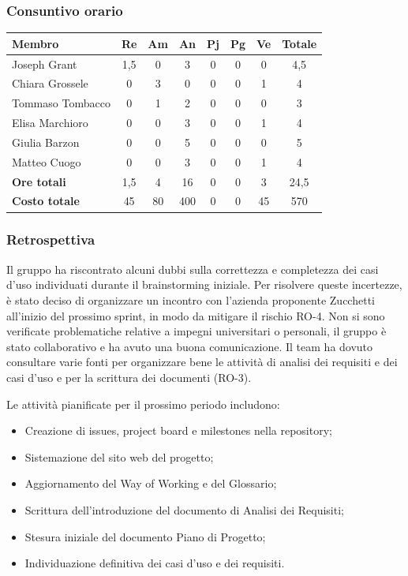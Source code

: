 \documentclass[11pt,a4paper]{article}
\begin{document}
\subsubsection{Consuntivo orario}
\begin{center}
    \begin{tabular}{|l|c|c|c|c|c|c|c|}
        \hline
        \textbf{Membro} & \textbf{Re} & \textbf{Am} & \textbf{An} & \textbf{Pj} & \textbf{Pg} & \textbf{Ve} & \textbf{Totale} \\
        \hline
        Joseph Grant & 1,5 & 0 & 3 & 0 & 0 & 0 & 4,5 \\
        \hline
        Chiara Grossele & 0 & 3 & 0 & 0 & 0 & 1 & 4 \\
        \hline
        Tommaso Tombacco & 0 & 1 & 2 & 0 & 0 & 0 & 3 \\
        \hline
        Elisa Marchioro & 0 & 0 & 3 & 0 & 0 & 1 & 4 \\
        \hline
        Giulia Barzon & 0 & 0 & 5 & 0 & 0 & 0 & 5 \\
        \hline
        Matteo Cuogo & 0 & 0 & 3 & 0 & 0 & 1 & 4 \\
        \hline
        \textbf{Ore totali} & 1,5 & 4 & 16 & 0 & 0 & 3 & 24,5 \\
        \hline
        \textbf{Costo totale} & 45 & 80 & 400 & 0 & 0 & 45 & 570 \\
        \hline
    \end{tabular}
\end{center}

\subsubsection{Retrospettiva}
Il gruppo ha riscontrato alcuni dubbi sulla correttezza e completezza dei casi d'uso individuati durante il brainstorming iniziale. Per risolvere queste incertezze, è stato deciso di organizzare un incontro con l'azienda proponente Zucchetti all'inizio del prossimo sprint, in modo da mitigare il rischio RO-4.
Non si sono verificate problematiche relative a impegni universitari o personali, il gruppo è stato collaborativo e ha avuto una buona comunicazione. Il team ha dovuto consultare varie fonti per organizzare bene le attività di analisi dei requisiti e dei casi d'uso e per la scrittura dei documenti (RO-3).

Le attività pianificate per il prossimo periodo includono:
\begin{itemize}
    \item Creazione di issues, project board e milestones nella repository;
    \item Sistemazione del sito web del progetto;
    \item Aggiornamento del Way of Working e del Glossario;
    \item Scrittura dell'introduzione del documento di Analisi dei Requisiti;
    \item Stesura iniziale del documento Piano di Progetto;
    \item Individuazione definitiva dei casi d'uso e dei requisiti.
\end{itemize}
\end{document}
